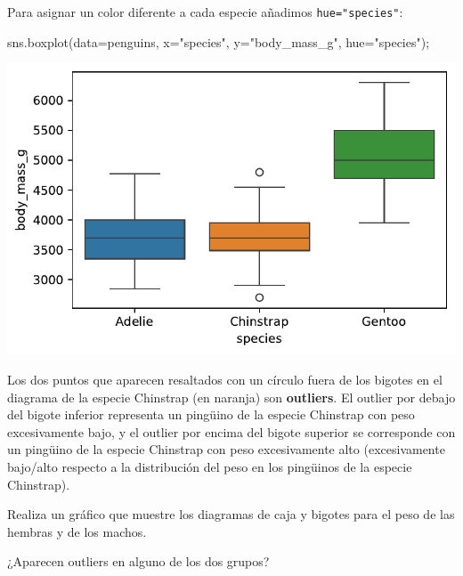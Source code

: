 \documentclass[
  a4paper,
  noprof,
  12pt,
  notoc,
  nosols,
  nobib]{mnye}
\newenvironment{Shaded}{\begin{snugshade}}{\end{snugshade}}
\newcommand{\NormalTok}[1]{\textcolor[rgb]{0.00,0.23,0.31}{#1}}
\newcommand{\OperatorTok}[1]{\textcolor[rgb]{0.37,0.37,0.37}{#1}}
\newcommand{\StringTok}[1]{\textcolor[rgb]{0.13,0.47,0.30}{#1}}
\renewenvironment{exercise}[1][]{
            \if\relax\detokenize{#1}\relax
                \ex
            \else
                \ex[note={#1}]
            \fi
        }{\endex}
\theoremstyle{definition}
\newtheorem{exercise}{Ejercicio}[section]
\theoremstyle{remark}
\begin{document}
Para asignar un color diferente a cada especie añadimos
\texttt{hue="species"}:

\begin{Shaded}
\begin{Highlighting}[]
\NormalTok{sns.boxplot(data}\OperatorTok{=}\NormalTok{penguins, x}\OperatorTok{=}\StringTok{"species"}\NormalTok{, y}\OperatorTok{=}\StringTok{"body\_mass\_g"}\NormalTok{, hue}\OperatorTok{=}\StringTok{"species"}\NormalTok{)}\OperatorTok{;}
\end{Highlighting}
\end{Shaded}

\includegraphics{chapters/numerical_by_categorical_files/figure-pdf/cell-13-output-1.pdf}

Los dos puntos que aparecen resaltados con un círculo fuera de los
bigotes en el diagrama de la especie Chinstrap (en naranja) son
\textbf{outliers}. El outlier por debajo del bigote inferior representa
un pingüino de la especie Chinstrap con peso excesivamente bajo, y el
outlier por encima del bigote superior se corresponde con un pingüino de
la especie Chinstrap con peso excesivamente alto (excesivamente
bajo/alto respecto a la distribución del peso en los pingüinos de la
especie Chinstrap).

\begin{exercise}[]%
\protect\hypertarget{exr-boxplots}{}\label{exr-boxplots}%
Realiza un gráfico que muestre los diagramas de caja y bigotes para el
peso de las hembras y de los machos.

¿Aparecen outliers en alguno de los dos grupos?

\end{exercise}




\cleardoublepage
\printsols
\myprintbibliography[title=Bibliografía]
\end{document}
